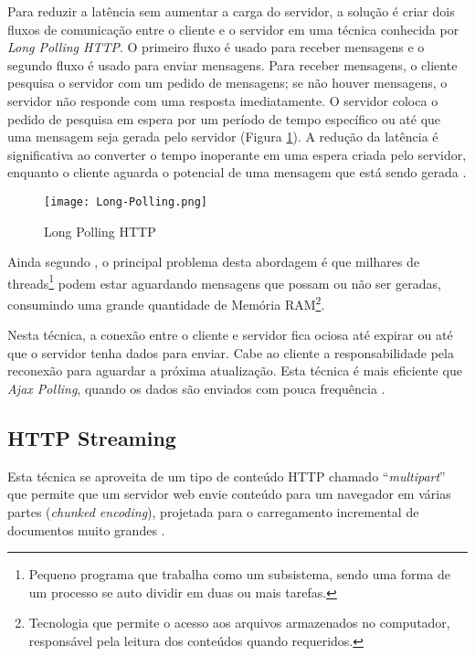 Para reduzir a latência sem aumentar a carga do servidor, a solução é criar dois fluxos de comunicação entre o cliente e o servidor em uma técnica conhecida por \emph{Long Polling HTTP}. O primeiro fluxo é usado para receber mensagens e o segundo fluxo é usado para enviar mensagens. Para receber mensagens, o cliente pesquisa o servidor com um pedido de mensagens; se não houver mensagens, o servidor não responde com uma resposta imediatamente. O servidor coloca o pedido de pesquisa em espera por um período de tempo específico ou até que uma mensagem seja gerada pelo servidor  (Figura \ref{fig:longPolling}). A redução da latência é significativa ao converter o tempo inoperante em uma espera criada pelo servidor, enquanto o cliente aguarda o potencial de uma mensagem que está sendo gerada \cite{gross2006introduction}.

\begin{figure}[!htb]
	\centering
	\texttt{[image: Long-Polling.png]}
	\caption{Long Polling HTTP}
	\label{fig:longPolling}
\end{figure}

Ainda segundo , o principal problema desta abordagem é que milhares de threads\footnote{Pequeno programa que trabalha como um subsistema, sendo uma forma de um processo se auto dividir em duas ou mais tarefas.} podem estar aguardando mensagens que possam ou não ser geradas, consumindo uma grande quantidade de Memória RAM\footnote{Tecnologia que permite o acesso aos arquivos armazenados no computador, responsável pela leitura dos conteúdos quando requeridos.}.

Nesta técnica, a conexão entre o cliente e servidor fica ociosa até expirar ou até que o servidor tenha dados para enviar. Cabe ao cliente a responsabilidade pela reconexão para aguardar a próxima atualização. Esta técnica é mais eficiente que \emph{Ajax Polling}, quando os dados são enviados com pouca frequência \cite{gutwin2011real}.

\subsection{HTTP Streaming}

Esta técnica se aproveita de um tipo de conteúdo HTTP chamado “\emph{multipart}” que permite que um servidor web envie conteúdo para um navegador em várias partes (\emph{chunked encoding}), projetada para o carregamento incremental de documentos muito grandes \cite{gutwin2011real}.

